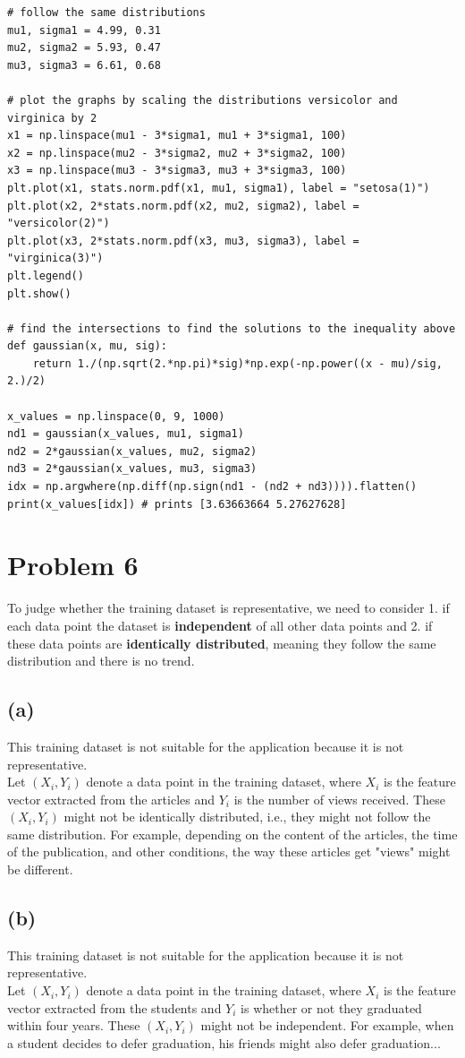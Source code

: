 \documentclass[11pt]{article}
\begin{document}
\begin{verbatim}
# follow the same distributions
mu1, sigma1 = 4.99, 0.31
mu2, sigma2 = 5.93, 0.47
mu3, sigma3 = 6.61, 0.68

# plot the graphs by scaling the distributions versicolor and virginica by 2
x1 = np.linspace(mu1 - 3*sigma1, mu1 + 3*sigma1, 100)
x2 = np.linspace(mu2 - 3*sigma2, mu2 + 3*sigma2, 100)
x3 = np.linspace(mu3 - 3*sigma3, mu3 + 3*sigma3, 100)
plt.plot(x1, stats.norm.pdf(x1, mu1, sigma1), label = "setosa(1)")
plt.plot(x2, 2*stats.norm.pdf(x2, mu2, sigma2), label = "versicolor(2)")
plt.plot(x3, 2*stats.norm.pdf(x3, mu3, sigma3), label = "virginica(3)")
plt.legend()
plt.show()

# find the intersections to find the solutions to the inequality above
def gaussian(x, mu, sig):
    return 1./(np.sqrt(2.*np.pi)*sig)*np.exp(-np.power((x - mu)/sig, 2.)/2)

x_values = np.linspace(0, 9, 1000)
nd1 = gaussian(x_values, mu1, sigma1)
nd2 = 2*gaussian(x_values, mu2, sigma2)
nd3 = 2*gaussian(x_values, mu3, sigma3)
idx = np.argwhere(np.diff(np.sign(nd1 - (nd2 + nd3)))).flatten()
print(x_values[idx]) # prints [3.63663664 5.27627628]
\end{verbatim}

\newpage
\section{Problem 6}
To judge whether the training dataset is representative, we need to consider 1. if each data point the dataset is \textbf{independent} of all other data points and 2. if these data points are \textbf{identically distributed}, meaning they follow the same distribution and there is no trend.
\subsection{(a)}
This training dataset is not suitable for the application because it is not representative. \\
Let $(X_i, Y_i)$ denote a data point in the training dataset, where $X_i$ is the feature vector extracted from the articles and $Y_i$ is the number of views received. These $(X_i, Y_i)$ might not be identically distributed, i.e., they might not follow the same distribution. For example, depending on the content of the articles, the time of the publication, and other conditions, the way these articles get "views" might be different.

\subsection{(b)}
This training dataset is not suitable for the application because it is not representative. \\
Let $(X_i, Y_i)$ denote a data point in the training dataset, where $X_i$ is the feature vector extracted from the students and $Y_i$ is whether or not they graduated within four years. These $(X_i, Y_i)$ might not be independent. For example, when a student decides to defer graduation, his friends might also defer graduation...
\end{document}

